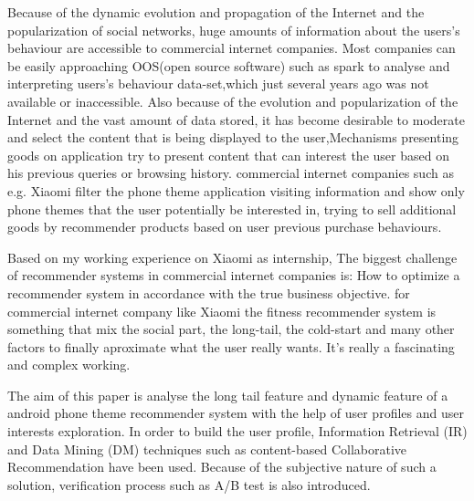 \begin{enabstract}
Because of the dynamic evolution and propagation of the Internet and the popularization of social networks, huge amounts of information about the users's behaviour are accessible to commercial internet companies. Most companies can be easily approaching OOS(open source software) such as spark to analyse and interpreting users's behaviour data-set,which just several years ago was not available or inaccessible. Also because of the evolution and popularization of the Internet and the vast amount of data stored, it has become desirable to moderate and select the content that is being displayed to the user,Mechanisms presenting goods on application try to present content that can interest the user based on his previous queries or browsing history. commercial internet companies such as e.g. Xiaomi filter the phone theme application visiting information and show only phone themes that the user potentially be interested in, trying to sell additional goods by recommender products based on user previous purchase behaviours.

Based on my working experience on Xiaomi as internship, The biggest challenge of recommender systems in commercial internet companies is: How to optimize a recommender system in accordance with the true business objective. for commercial internet company like Xiaomi the fitness recommender system is something that mix the social part, the long-tail, the cold-start and many other factors to finally aproximate what the user really wants. It's really a fascinating and complex working. 

The aim of this paper is analyse the long tail feature and dynamic feature of a android phone theme recommender system with the help of user profiles and user interests exploration. In order to build the user profile, Information Retrieval (IR) and Data Mining (DM) techniques such as content-based Collaborative Recommendation have been used. Because of the subjective nature of such a solution, verification process such as A/B test is also introduced.

\end{enabstract}
